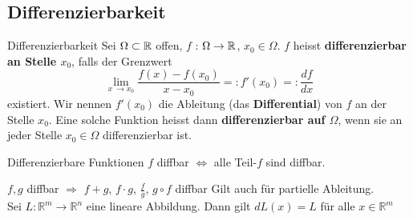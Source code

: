 \subsection{Differenzierbarkeit}

\begin{Definition}{Differenzierbarkeit}{}
    Sei $\Omega \subset \mathbb{R}$ offen, $f$ : $\Omega \to \mathbb{R}$, $x_0\in\Omega$. $f$ heisst \textbf{differenzierbar an Stelle $x_0$}, falls der Grenzwert
    \[
    \lim_{x\ \to x_0} \frac{f(x) - f(x_0)}{x - x_0} =:
    f'(x_0) =:
    \frac{df}{dx}
    \]
    existiert. Wir nennen $f'(x_0)$ die Ableitung (das \textbf{Differential}) von $f$ an der Stelle $x_0$. Eine solche Funktion heisst dann \textbf{differenzierbar auf $\Omega$}, wenn sie an jeder Stelle $x_0 \in \Omega$ differenzierbar ist.
\end{Definition}
\begin{Satz}{Differenzierbare Funktionen}{}
	$f$ diffbar $\Leftrightarrow$ alle Teil-$f$ sind diffbar.

	$f,g$ diffbar $\Rightarrow$ $f+g$, $f \cdot g$, $\frac{f}{g}$, $g \circ f$ diffbar
	Gilt auch für partielle Ableitung.\\

	Sei $L: \mathbb{R}^m \rightarrow \mathbb{R}^n$ eine lineare Abbildung. Dann gilt $dL(x) = L$ für alle $x \in \mathbb{R}^m$

\end{Satz}

